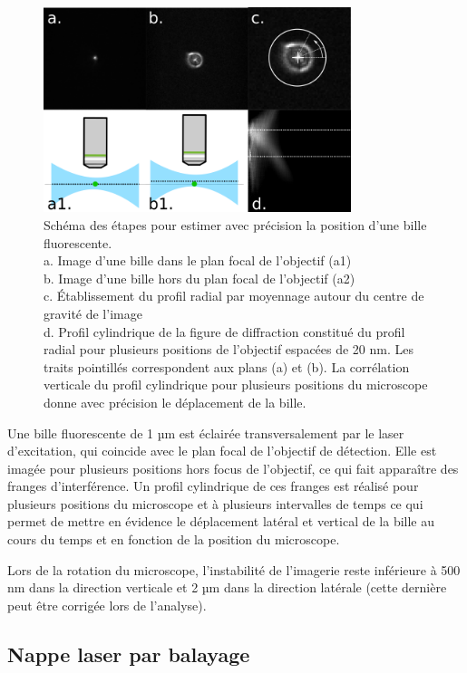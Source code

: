 \begin{figure}
\centering
\includegraphics[width=0.8\textwidth]{./files/bead_position.svg.png}
\caption{Schéma des étapes pour estimer avec précision la position d'une bille fluorescente.\\
a. Image d'une bille dans le plan focal de l'objectif (a1)\\
b. Image d'une bille hors du plan focal de l'objectif (a2)\\
c. Établissement du profil radial par moyennage autour du centre de gravité de l'image\\
d. Profil cylindrique de la figure de diffraction constitué du profil radial pour plusieurs positions de l'objectif espacées de 20 nm. Les traits pointillés correspondent aux plans (a) et (b). La corrélation verticale du profil cylindrique pour plusieurs positions du microscope donne avec précision le déplacement de la bille.}
\end{figure}

Une bille fluorescente de 1 µm est éclairée transversalement par le laser d'excitation, qui coincide avec le plan focal de l'objectif de détection. Elle est imagée pour plusieurs positions hors focus de l'objectif, ce qui fait apparaître des franges d'interférence. Un profil cylindrique de ces franges est réalisé pour plusieurs positions du microscope et à plusieurs intervalles de temps ce qui permet de mettre en évidence le déplacement latéral et vertical de la bille au cours du temps et en fonction de la position du microscope.

Lors de la rotation du microscope, l'instabilité de l'imagerie reste inférieure à 500 nm dans la direction verticale et 2 µm dans la direction latérale (cette dernière peut être corrigée lors de l'analyse).


\subsection{Nappe laser par balayage}

